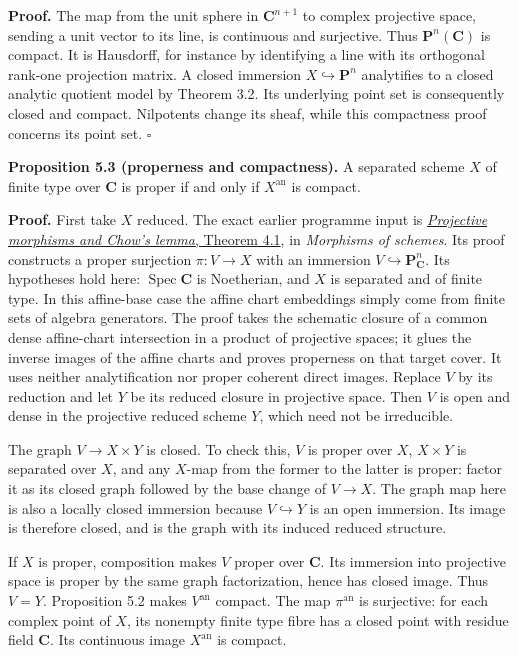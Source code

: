 \documentclass[11pt]{article}
\begin{document}
\textbf{Proof.} The map from the unit sphere in \(\mathbf C^{n+1}\) to
complex projective space, sending a unit vector to its line, is
continuous and surjective. Thus \(\mathbf P^n(\mathbf C)\) is compact.
It is Hausdorff, for instance by identifying a line with its orthogonal
rank-one projection matrix. A closed immersion
\(X\hookrightarrow\mathbf P^n\) analytifies to a closed analytic
quotient model by Theorem 3.2. Its underlying point set is consequently
closed and compact. Nilpotents change its sheaf, while this compactness
proof concerns its point set. \(\square\)

\textbf{Proposition 5.3 (properness and compactness).} A separated
scheme \(X\) of finite type over \(\mathbf C\) is proper if and only if
\(X^{\mathrm{an}}\) is compact.

\textbf{Proof.} First take \(X\) reduced. The exact earlier programme
input is
\href{../AG-GS/prerequisites/AG-MO/projective-morphisms-and-chows-lemma.html}{\emph{Projective
morphisms and Chow's lemma}, Theorem 4.1}, in \emph{Morphisms of
schemes}. Its proof constructs a proper surjection \(\pi:V\to X\) with
an immersion \(V\hookrightarrow\mathbf P^n_{\mathbf C}\). Its hypotheses
hold here: \(\operatorname{Spec}\mathbf C\) is Noetherian, and \(X\) is
separated and of finite type. In this affine-base case the affine chart
embeddings simply come from finite sets of algebra generators. The proof
takes the schematic closure of a common dense affine-chart intersection
in a product of projective spaces; it glues the inverse images of the
affine charts and proves properness on that target cover. It uses
neither analytification nor proper coherent direct images. Replace \(V\)
by its reduction and let \(Y\) be its reduced closure in projective
space. Then \(V\) is open and dense in the projective reduced scheme
\(Y\), which need not be irreducible.

The graph \(V\to X\times Y\) is closed. To check this, \(V\) is proper
over \(X\), \(X\times Y\) is separated over \(X\), and any \(X\)-map
from the former to the latter is proper: factor it as its closed graph
followed by the base change of \(V\to X\). The graph map here is also a
locally closed immersion because \(V\hookrightarrow Y\) is an open
immersion. Its image is therefore closed, and is the graph with its
induced reduced structure.

If \(X\) is proper, composition makes \(V\) proper over \(\mathbf C\).
Its immersion into projective space is proper by the same graph
factorization, hence has closed image. Thus \(V=Y\). Proposition 5.2
makes \(V^{\mathrm{an}}\) compact. The map \(\pi^{\mathrm{an}}\) is
surjective: for each complex point of \(X\), its nonempty finite type
fibre has a closed point with residue field \(\mathbf C\). Its
continuous image \(X^{\mathrm{an}}\) is compact.
\end{document}
